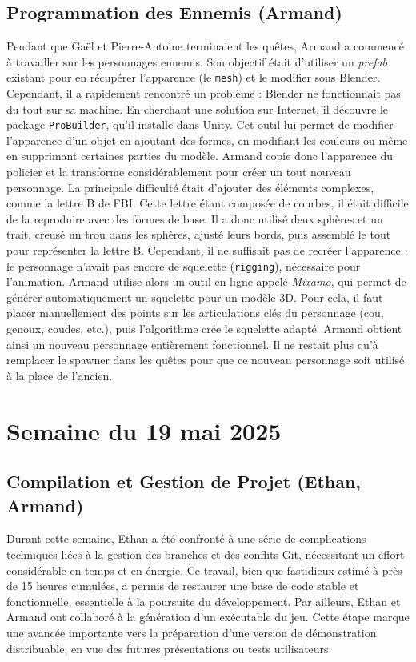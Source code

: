 \documentclass{report}
\begin{document}
\subsection*{Programmation des Ennemis (Armand)}
Pendant que Gaël et Pierre-Antoine terminaient les quêtes, Armand a commencé à travailler sur les personnages ennemis. Son objectif était d’utiliser un \textit{prefab} existant pour en récupérer l’apparence (le \texttt{mesh}) et le modifier sous Blender. Cependant, il a rapidement rencontré un problème : Blender ne fonctionnait pas du tout sur sa machine. En cherchant une solution sur Internet, il découvre le package \texttt{ProBuilder}, qu’il installe dans Unity. Cet outil lui permet de modifier l’apparence d’un objet en ajoutant des formes, en modifiant les couleurs ou même en supprimant certaines parties du modèle. Armand copie donc l’apparence du policier et la transforme considérablement pour créer un tout nouveau personnage. La principale difficulté était d’ajouter des éléments complexes, comme la lettre B de FBI. Cette lettre étant composée de courbes, il était difficile de la reproduire avec des formes de base. Il a donc utilisé deux sphères et un trait, creusé un trou dans les sphères, ajusté leurs bords, puis assemblé le tout pour représenter la lettre B.
Cependant, il ne suffisait pas de recréer l’apparence : le personnage n’avait pas encore de squelette (\texttt{rigging}), nécessaire pour l’animation. Armand utilise alors un outil en ligne appelé \textit{Mixamo}, qui permet de générer automatiquement un squelette pour un modèle 3D. Pour cela, il faut placer manuellement des points sur les articulations clés du personnage (cou, genoux, coudes, etc.), puis l’algorithme crée le squelette adapté. Armand obtient ainsi un nouveau personnage entièrement fonctionnel. Il ne restait plus qu’à remplacer le spawner dans les quêtes pour que ce nouveau personnage soit utilisé à la place de l’ancien.

\newpage
\section{Semaine du 19 mai 2025}

\subsection*{Compilation et Gestion de Projet (Ethan, Armand)}
Durant cette semaine, Ethan a été confronté à une série de complications techniques liées à la gestion des branches et des conflits Git, nécessitant un effort considérable en temps et en énergie. Ce travail, bien que fastidieux estimé à près de 15 heures cumulées, a permis de restaurer une base de code stable et fonctionnelle, essentielle à la poursuite du développement. Par ailleurs, Ethan et Armand ont collaboré à la génération d’un exécutable du jeu. Cette étape marque une avancée importante vers la préparation d’une version de démonstration distribuable, en vue des futures présentations ou tests utilisateurs.
\end{document}
